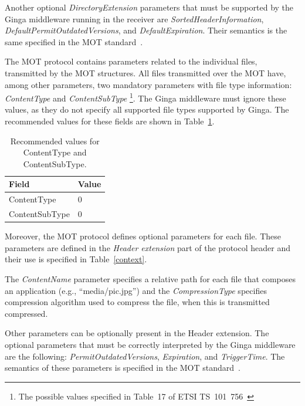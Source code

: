 \documentclass[11pt]{article}
\begin{document}
Another optional \emph{DirectoryExtension} parameters that must be supported
by the Ginga middleware running in the receiver are
\emph{SortedHeaderInformation}, \emph{DefaultPermitOutdatedVersions}, and
\emph{DefaultExpiration}.  Their semantics is the same specified in the MOT
standard~\cite{ETSI-301234-2006}.

The MOT protocol contains parameters related to the individual files,
transmitted by the MOT structures.  All files transmitted over the MOT
have, among other parameters, two mandatory parameters with file type
information: \emph{ContentType} and \emph{ContentSubType}\null
\footnote{The possible values specified in Table~17 of ETSI
          TS~101~756~\cite{ETSI-101756-2015}}.
The Ginga middleware must ignore these values, as they do not specify all
supported file types supported by Ginga.
The recommended values for these fields are shown in Table~\ref{types}.

\begin{table}[H]
\centering
\caption{Recommended values for ContentType and ContentSubType.}
\label{types}
\begin{tabular}{|l|l|}
  \hline
  Field & Value \\
  \hline
  ContentType & 0 \\
  \hline
  ContentSubType & 0 \\
  \hline
\end{tabular}
\end{table}

Moreover, the MOT protocol defines optional parameters for each file. These
parameters are defined
in the \emph{Header extension} part of the protocol header and their
use is specified in Table~\ref{context}.

The \emph{ContentName} parameter specifies a relative path for each file
that composes an application (e.g., ``media/pic.jpg'') and the
\emph{CompressionType} specifies compression algorithm used to compress the
file, when this is transmitted compressed.

Other parameters can be optionally present in the Header extension.
The optional parameters that must be correctly interpreted by the Ginga
middleware are the following: \emph{PermitOutdatedVersions},
\emph{Expiration}, and \emph{TriggerTime}.  The semantics of these
parameters is specified in the MOT standard~\cite{ETSI-301234-2006}.
\end{document}
